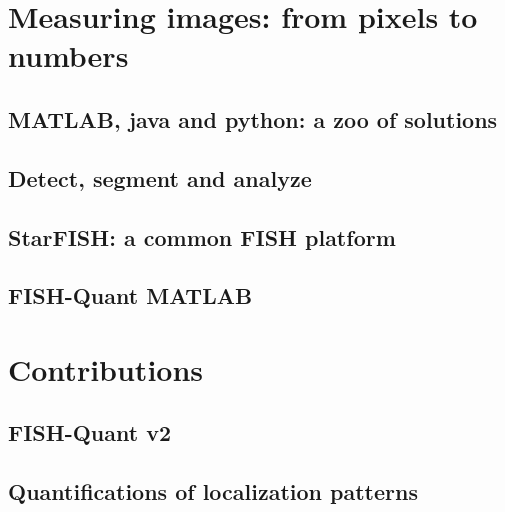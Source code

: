 \section{Measuring images: from pixels to numbers}


\subsection{MATLAB, java and python: a zoo of solutions}

\subsection{Detect, segment and analyze}

\subsection{StarFISH: a common \ac{FISH} platform}

\subsection{FISH-Quant MATLAB}


\section{Contributions}


\subsection{FISH-Quant v2}

\subsection{Quantifications of localization patterns}

